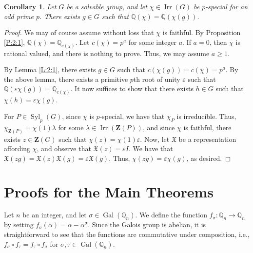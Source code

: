 \documentclass[12pt]{amsart}
\newtheorem{corollary}[theorem]{Corollary}
\theoremstyle{definition}
\newcommand{\Q}{\mathbb{Q}}
\DeclareMathOperator{\Gal}{Gal}
\DeclareMathOperator{\Syl}{Syl}
\DeclareMathOperator{\Irr}{Irr}
\newcommand{\Cent}{\mathbf{Z}}
\begin{document}
\begin{corollary}
	Let $G$ be a solvable group, and let $\chi \in \Irr(G)$ be $p$-special for an odd prime $p$. There exists $g \in G$ such that $\Q(\chi) = \Q(\chi(g))$.
\end{corollary}
\begin{proof}
	We may of course assume without loss that $\chi$ is faithful. By Proposition \ref{P:2:1}, $\Q(\chi) = \Q_{c(\chi)}$. Let $c(\chi) = p^a$ for some integer $a$. If $a = 0$, then $\chi$ is rational valued, and there is nothing to prove. Thus, we may assume $a \geq 1$. 
	
	By Lemma \ref{L:2:1}, there exists $g \in G$ such that $c(\chi(g)) = c(\chi) = p^a$. By the above lemma, there exists a primitive $p$th root of unity $\varepsilon$ such that $\Q(\varepsilon\chi(g)) = \Q_{c(\chi)}$. It now suffices to show that there exists $h \in G$ such that $\chi(h) = \varepsilon\chi(g)$.
	
	 For $P \in \Syl_p(G)$, since $\chi$ is $p$-special, we have that $\chi_P$ is irreducible. Thus, $\chi_{\Cent(P)} = \chi(1)\lambda$ for some $\lambda \in \Irr(\Cent(P))$, and since $\chi$ is faithful, there exists $z \in \Cent(G)$ such that $\chi(z) = \chi(1)\varepsilon$.  
	 Now, let $\mathfrak{X}$ be a representation affording $\chi$, and observe that $\mathfrak{X}(z) = \varepsilon I$. We have that $\mathfrak{X}(zg) = \mathfrak{X}(z)\mathfrak{X}(g) = \varepsilon\mathfrak{X}(g)$. Thus, $\chi(zg) = \varepsilon\chi(g)$, as desired.
\end{proof}
 

\section{Proofs for the Main Theorems}

Let $n$ be an integer, and let $\sigma \in \Gal(\Q_n)$. We define the function $f_{\sigma}: \Q_n \to \Q_n$ by setting $f_\sigma(\alpha) = \alpha - \alpha^\sigma$. Since the Galois group is abelian, it is straightforward to see that the functions are commutative under composition, i.e., $f_\sigma \circ f_\tau = f_\tau \circ f_\sigma$ for $\sigma, \tau \in \Gal(\Q_n)$. 
\end{document}
